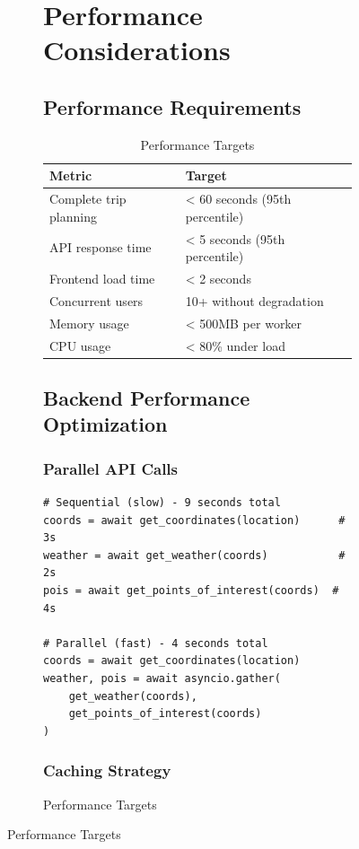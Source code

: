 \documentclass[12pt,a4paper]{report}
\begin{document}
\begin{figure}[H]
\begin{plantuml}
\begin{figure}[H]
\begin{plantuml}
\chapter{Performance Considerations}

\section{Performance Requirements}

\begin{table}[H]
\centering
\begin{tabular}{|l|p{10cm}|}
\hline
\textbf{Metric} & \textbf{Target} \\
\hline
Complete trip planning & < 60 seconds (95th percentile) \\
\hline
API response time & < 5 seconds (95th percentile) \\
\hline
Frontend load time & < 2 seconds \\
\hline
Concurrent users & 10+ without degradation \\
\hline
Memory usage & < 500MB per worker \\
\hline
CPU usage & < 80\% under load \\
\hline
\end{tabular}
\caption{Performance Targets}
\label{tab:performance-targets}
\end{table}

\section{Backend Performance Optimization}

\subsection{Parallel API Calls}

\begin{lstlisting}[style=pythonstyle, caption={Parallel Execution with asyncio}]
# Sequential (slow) - 9 seconds total
coords = await get_coordinates(location)      # 3s
weather = await get_weather(coords)           # 2s
pois = await get_points_of_interest(coords)  # 4s

# Parallel (fast) - 4 seconds total
coords = await get_coordinates(location)
weather, pois = await asyncio.gather(
    get_weather(coords),
    get_points_of_interest(coords)
)
\end{lstlisting}

\subsection{Caching Strategy}


\end{plantuml}
\end{figure}
\end{plantuml}
\end{figure}
\end{document}
